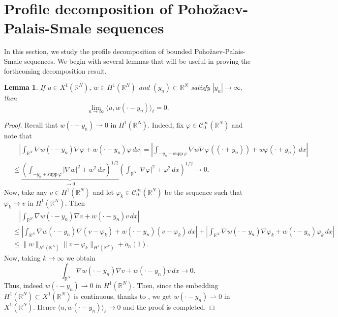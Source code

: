 \documentclass[12pt,leqno,twoside,sort]{amsart}
\newtheorem{Lem}[Th]{Lemma}
\newcommand{\R}{\mathbb{R}}
\newcommand{\cC}{{\mathcal C}}
\newcommand{\weakto}{\rightharpoonup}
\numberwithin{equation}{section}
\newcommand{\supp}{\mathrm{supp}\,}
\begin{document}
\section{Profile decomposition of Poho\v{z}aev-Palais-Smale sequences}\label{sect:4}

In this section, we study the profile decomposition of bounded Poho\v{z}aev-Palais-Smale sequences. We begin with several lemmas that will be useful in proving the forthcoming decomposition result.


\begin{Lem}\label{L:scalar_product_translation}
If $u \in X^1 (\R^N)$, $w \in H^1 (\R^N)$ and $(y_n) \subset \R^N$ satisfy $|y_n| \to \infty$, then
\[
\lim_{n\to\infty} \langle u,w(\cdot-y_n)\rangle_\ell = 0.
\]
\end{Lem}

\begin{proof}
Recall that $w(\cdot -y_n) \weakto 0$ in $H^1 (\R^N)$. Indeed, fix $\varphi \in \cC_0^\infty (\R^N)$ and note that
\begin{align*}
&\quad \left| \int_{\R^N} \nabla w (\cdot - y_n) \nabla \varphi + w(\cdot - y_n) \varphi \, dx \right| = \left| \int_{-y_n + \supp \varphi} \nabla w \nabla \varphi ( (\cdot + y_n) ) + w \varphi (\cdot + y_n) \, dx \right| \\
&\leq \underbrace{\left( \int_{-y_n + \supp \varphi} |\nabla w|^2 + w^2 \, dx \right)^{1/2}}_{\to 0} \left( \int_{\R^N} |\nabla \varphi|^2 + \varphi^2 \, dx \right)^{1/2} \to 0.
\end{align*}
Now, take any $v \in H^1 (\R^N)$ and let $\varphi_k \in \cC_0^\infty (\R^N)$ be the sequence such that $\varphi_k \to v$ in $H^1(\R^N)$. Then
\begin{align*}
&\quad \left| \int_{\R^N} \nabla w (\cdot - y_n) \nabla v + w(\cdot - y_n) v \, dx \right| \\
&\leq \left| \int_{\R^N} \nabla w (\cdot - y_n) \nabla (v-\varphi_k) + w(\cdot - y_n) (v-\varphi_k) \, dx \right|  + \left| \int_{\R^N} \nabla w (\cdot - y_n) \nabla \varphi_k + w(\cdot - y_n) \varphi_k \, dx \right| \\
&\leq \|w\|_{H^1(\R^N)} \|v-\varphi_k\|_{H^1(\R^N)} + o_n(1).
\end{align*}
Now, taking $k\to\infty$ we obtain 
$$
\int_{\R^N} \nabla w (\cdot - y_n) \nabla v + w(\cdot - y_n) v \, dx \to 0.
$$
Thus, indeed $w(\cdot -y_n) \weakto 0$ in $H^1 (\R^N)$. Then, since the embedding $H^1 (\R^N) \subset X^1 (\R^N)$ is continuous, thanks to \cite[Theorem 3.10]{Brezis}, we get $w(\cdot - y_n) \weakto 0$ in $X^1 (\R^N)$. Hence $\langle u, w(\cdot - y_n) \rangle_\ell \to 0$ and the proof is completed.
\end{proof}
\end{document}

